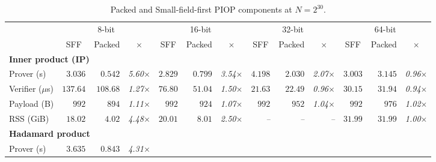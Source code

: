 \begin{table}[!t]
\centering
\setlength{\tabcolsep}{1.5pt}
\begin{threeparttable}
\caption{Packed and Small-field-first PIOP components at \(N=2^{30}\).}
\label{table:component}
\small
\scriptsize
\begin{tabular*}{\textwidth}{@{\extracolsep{\fill}}lrrrrrrrrrrrr@{}}
\toprule
& \multicolumn{3}{c}{8-bit}
& \multicolumn{3}{c}{16-bit}
& \multicolumn{3}{c}{32-bit}
& \multicolumn{3}{c}{64-bit} \\
\cmidrule(lr){2-4}\cmidrule(lr){5-7}
\cmidrule(lr){8-10}\cmidrule(l){11-13}
& \multicolumn{1}{c}{SFF}
& \multicolumn{1}{c}{Packed}
& \multicolumn{1}{c}{$\times$}
& \multicolumn{1}{c}{SFF}
& \multicolumn{1}{c}{Packed}
& \multicolumn{1}{c}{$\times$}
& \multicolumn{1}{c}{SFF}
& \multicolumn{1}{c}{Packed}
& \multicolumn{1}{c}{$\times$}
& \multicolumn{1}{c}{SFF}
& \multicolumn{1}{c}{Packed}
& \multicolumn{1}{c}{$\times$} \\
\midrule
\multicolumn{13}{l}{\textbf{Inner product (IP)}} \\
Prover (s)
  & $3.036$ & $0.542$ & \textcolor{black!80}{\textit{5.60}\(\times\)}
  & $2.829$ & $0.799$ & \textcolor{black!80}{\textit{3.54}\(\times\)}
  & $4.198$ & $2.030$ & \textcolor{black!80}{\textit{2.07}\(\times\)}
  & $3.003$ & $3.145$ & \textcolor{black!80}{\textit{0.96}\(\times\)} \\
Verifier ($\mu$s)
  & $137.64$ & $108.68$ & \textcolor{black!80}{\textit{1.27}\(\times\)}
  & $76.80$ & $51.04$ & \textcolor{black!80}{\textit{1.50}\(\times\)}
  & $21.63$ & $22.49$ & \textcolor{black!80}{\textit{0.96}\(\times\)}
  & $30.15$ & $31.94$ & \textcolor{black!80}{\textit{0.94}\(\times\)} \\
Payload (B)
  & $992$ & $894$ & \textcolor{black!80}{\textit{1.11}\(\times\)}
  & $992$ & $924$ & \textcolor{black!80}{\textit{1.07}\(\times\)}
  & $992$ & $952$ & \textcolor{black!80}{\textit{1.04}\(\times\)}
  & $992$ & $976$ & \textcolor{black!80}{\textit{1.02}\(\times\)} \\
RSS (GiB)
  & $18.02$ & $4.02$ & \textcolor{black!80}{\textit{4.48}\(\times\)}
  & $20.01$ & $8.01$ & \textcolor{black!80}{\textit{2.50}\(\times\)}
  & \textit{--} & \textit{--} & \textcolor{black!80}{\textit{--}}
  & $31.99$ & $31.99$ & \textcolor{black!80}{\textit{1.00}\(\times\)} \\
\midrule
\multicolumn{13}{l}{\textbf{Hadamard product}} \\
Prover (s)
  & $3.635$ & $0.843$ & \textcolor{black!80}{\textit{4.31}\(\times\)}

\end{tabular*}
\end{threeparttable}
\end{table}

